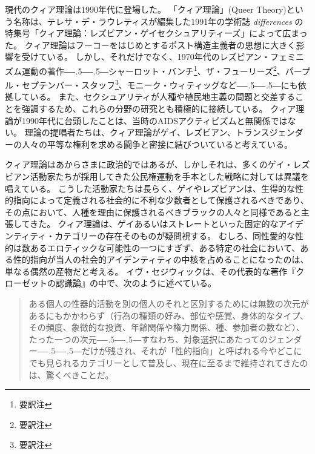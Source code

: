 \documentclass[paper=a4,book,openany]{jlreq}
\def\DDASH{―\kern-.5\zw―\kern-.5\zw―} %
\begin{document}
現代のクィア理論は1990年代に登場した。
「クィア理論」(Queer Theory)という名称は、テレサ・デ・ラウレティスが編集した1991年の学術誌 \emph{differences} の特集号「クィア理論：レズビアン・ゲイセクシュアリティーズ」によって広まった\citep{lauretis91:_diff}。
クィア理論はフーコーをはじめとするポスト構造主義者の思想に大きく影響を受けている。
しかし、それだけでなく、1970年代のレズビアン・フェミニズム運動の著作{\DDASH}シャーロット・バンチ\footnote{要訳注}、ザ・フューリーズ\footnote{要訳注}、パープル・セプテンバー・スタッフ\footnote{要訳注}、モニーク・ウィティッグなど{\DDASH}にも依拠している。
また、セクシュアリティが人種や植民地主義の問題と交差することを強調するため、これらの分野の研究とも積極的に接続している。
クィア理論が1990年代に台頭したことは、当時のAIDSアクティビズムと無関係ではない。
理論の提唱者たちは、クィア理論がゲイ、レズビアン、トランスジェンダーの人々の平等な権利を求める闘争と密接に結びついていると考えている。

クィア理論はあからさまに政治的ではあるが、しかしそれは、多くのゲイ・レズビアン活動家たちが採用してきた公民権運動を手本とした戦略に対しては異議を唱えている。
こうした活動家たちは長らく、ゲイやレズビアンは、生得的な性的指向によって定義される社会的に不利な少数者として保護されるべきであり、その点において、人種を理由に保護されるべきブラックの人々と同様であると主張してきた。
クィア理論は、ゲイあるいはストレートといった固定的なアイデンティティ・カテゴリーの存在そのものが疑問視する。
むしろ、同性愛的な性的は数あるエロティックな可能性の一つにすぎず、ある特定の社会において、ある性的指向が当人の社会的アイデンティティの中核を占めることになったのは、単なる偶然の産物だと考える。
イヴ・セジウィックは、その代表的な著作『クローゼットの認識論』の中で、次のように述べている。

\begin{quote}
  ある個人の性器的活動を別の個人のそれと区別するためには無数の次元があるにもかかわらず（行為の種類の好み、部位や感覚、身体的なタイプ、その頻度、象徴的な投資、年齢関係や権力関係、種、参加者の数など）、たった一つの次元{\DDASH}すなわち、対象選択にあたってのジェンダー{\DDASH}だけが残され、それが「性的指向」と呼ばれる今やどこにでも見られるカテゴリーとして普及し、現在に至るまで維持されてきたのは、驚くべきことだ。
\citep{sedgwick90:_epist_closet}

\end{quote}
\end{document}
